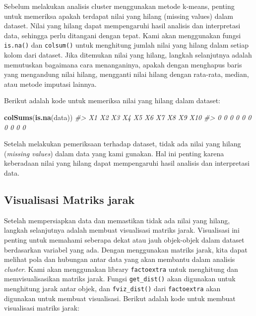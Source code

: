 \documentclass[
  oneside]{book}
\newenvironment{Shaded}{\begin{snugshade}}{\end{snugshade}}
\newcommand{\CommentTok}[1]{\textcolor[rgb]{0.56,0.35,0.01}{\textit{#1}}}
\newcommand{\FunctionTok}[1]{\textcolor[rgb]{0.13,0.29,0.53}{\textbf{#1}}}
\newcommand{\NormalTok}[1]{#1}
\begin{document}
Sebelum melakukan analisis cluster menggunakan metode k-means, penting untuk memeriksa apakah terdapat nilai yang hilang (missing values) dalam dataset. Nilai yang hilang dapat mempengaruhi hasil analisis dan interpretasi data, sehingga perlu ditangani dengan tepat. Kami akan menggunakan fungsi \texttt{is.na()} dan \texttt{colsum()} untuk menghitung jumlah nilai yang hilang dalam setiap kolom dari dataset. Jika ditemukan nilai yang hilang, langkah selanjutnya adalah memutuskan bagaimana cara menanganinya, apakah dengan menghapus baris yang mengandung nilai hilang, mengganti nilai hilang dengan rata-rata, median, atau metode imputasi lainnya.

Berikut adalah kode untuk memeriksa nilai yang hilang dalam dataset:

\begin{Shaded}
\begin{Highlighting}[]
\FunctionTok{colSums}\NormalTok{(}\FunctionTok{is.na}\NormalTok{(data))}
\CommentTok{\#\textgreater{}  X1  X2  X3  X4  X5  X6  X7  X8  X9 X10 }
\CommentTok{\#\textgreater{}   0   0   0   0   0   0   0   0   0   0}
\end{Highlighting}
\end{Shaded}

Setelah melakukan pemeriksaan terhadap dataset, tidak ada nilai yang hilang (\emph{missing values}) dalam data yang kami gunakan. Hal ini penting karena keberadaan nilai yang hilang dapat mempengaruhi hasil analisis dan interpretasi data.

\subsection*{Visualisasi Matriks jarak}\label{visualisasi-matriks-jarak}

Setelah mempersiapkan data dan memastikan tidak ada nilai yang hilang, langkah selanjutnya adalah membuat visualisasi matriks jarak. Visualisasi ini penting untuk memahami seberapa dekat atau jauh objek-objek dalam dataset berdasarkan variabel yang ada. Dengan menggunakan matriks jarak, kita dapat melihat pola dan hubungan antar data yang akan membantu dalam analisis \emph{cluster}. Kami akan menggunakan library \texttt{factoextra} untuk menghitung dan memvisualisasikan matriks jarak. Fungsi \texttt{get\_dist()} akan digunakan untuk menghitung jarak antar objek, dan \texttt{fviz\_dist()} dari \texttt{factoextra} akan digunakan untuk membuat visualisasi. Berikut adalah kode untuk membuat visualisasi matriks jarak:
\end{document}
